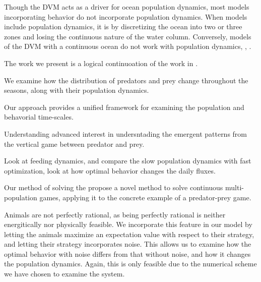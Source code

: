 Though the DVM acts as a driver for ocean population dynamics, most models incorporating behavior do not incorporate population dynamics. When models include population dynamics, it is by discretizing the ocean into two or three zones and losing the continuous nature of the water column. Conversely, models of the DVM with a continuous ocean do not work with population dynamics, \citep{}, \citep{}.

The work we present is a logical continuoation of the work in \citep{}.

We examine how the distribution of predators and prey change throughout the seasons, along with their population dynamics.

Our approach provides a unified framework for examining the population and behavorial time-scales.


Understanding advanced interest in undersntading the emergent patterns from the vertical game between predator and prey.

Look at feeding dynamics, and compare the slow population dynamics with fast optimization, look at how optimal behavior changes the daily fluxes. 




%
Our method of solving the propose a novel method to solve continuous multi-population games, applying it to the concrete example of a predator-prey game.

Animals are not perfectly rational, as being perfectly rational is neither energitically nor physically feasible. We incorporate this feature in our model by letting the animals maximize an expectation value with respect to their strategy, and letting their strategy incorporates noise. This allows us to examine how the optimal behavior with noise differs from that without noise, and how it changes the population dynamics. Again, this is only feasible due to the numerical scheme we have chosen to examine the system.

